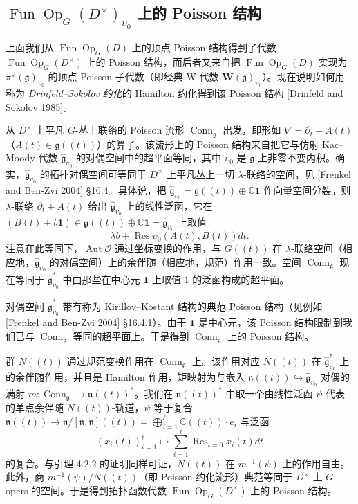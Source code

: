 \subsection{$\operatorname{Fun}\operatorname{Op}_G(D^\times)_{\upsilon_0}$ 上的 Poisson 结构}

上面我们从 $\operatorname{Fun}\operatorname{Op}_G(D)$ 上的顶点 Poisson 结构得到了代数 $\operatorname{Fun}\operatorname{Op}_G(D^\times)$ 上的 Poisson 结构，而后者又来自把 $\operatorname{Fun}\operatorname{Op}_G(D)$ 实现为 $\pi^\vee(\mathfrak g)_{\upsilon_0}$ 的顶点 Poisson 子代数（即经典 W-代数 $\mathbf W(\mathfrak g)_{\upsilon_0}$）。现在说明如何用称为 \emph{Drinfeld–Sokolov 约化}的 Hamilton 约化得到该 Poisson 结构 [Drinfeld and Sokolov 1985]。

从 $D^\times$ 上平凡 $G$-丛上联络的 Poisson 流形 $\operatorname{Conn}_{\mathfrak g}$ 出发，即形如 $\nabla=\partial_t+A(t)$（$A(t)\in\mathfrak g((t))$）的算子。该流形上的 Poisson 结构来自把它与仿射 Kac–Moody 代数 $\hat{\mathfrak g}_{\upsilon_0}$ 的对偶空间中的超平面等同，其中 $\upsilon_0$ 是 $\mathfrak g$ 上非零不变内积。确实，$\hat{\mathfrak g}_{\upsilon_0}$ 的拓扑对偶空间可等同于 $D^\times$ 上平凡丛上一切 $\lambda$-联络的空间，见 [Frenkel and Ben-Zvi 2004] §16.4。具体说，把 $\hat{\mathfrak g}_{\upsilon_0}=\mathfrak g((t))\oplus\mathbb C\mathbf 1$ 作向量空间分裂。则 $\lambda$-联络 $\partial_t+A(t)$ 给出 $\hat{\mathfrak g}_{\upsilon_0}$ 上的线性泛函，它在 $(B(t)+b\mathbf 1)\in\mathfrak g((t))\oplus\mathbb C\mathbf 1=\hat{\mathfrak g}_{\upsilon_0}$ 上取值
\[
    \lambda b+\operatorname{Res}\upsilon_0(A(t),B(t))dt.
\]
注意在此等同下，$\operatorname{Aut}\mathcal O$ 通过坐标变换的作用，与 $G((t))$ 在 $\lambda$-联络空间（相应地，$\hat{\mathfrak g}_{\upsilon_0}$ 的对偶空间）上的余伴随（相应地，规范）作用一致。空间 $\operatorname{Conn}_{\mathfrak g}$ 现在等同于 $\hat{\mathfrak g}^*_{\upsilon_0}$ 中由那些在中心元 $\mathbf 1$ 上取值 $1$ 的泛函构成的超平面。

对偶空间 $\hat{\mathfrak g}^*_{\upsilon_0}$ 带有称为 Kirillov–Kostant 结构的典范 Poisson 结构（见例如 [Frenkel and Ben-Zvi 2004] §16.4.1）。由于 $\mathbf 1$ 是中心元，该 Poisson 结构限制到我们已与 $\operatorname{Conn}_{\mathfrak g}$ 等同的超平面上。于是得到 $\operatorname{Conn}_{\mathfrak g}$ 上的 Poisson 结构。

群 $N((t))$ 通过规范变换作用在 $\operatorname{Conn}_{\mathfrak g}$ 上。该作用对应 $N((t))$ 在 $\hat{\mathfrak g}^*_{\upsilon_0}$ 上的余伴随作用，并且是 Hamilton 作用，矩映射为与嵌入 $\mathfrak n((t))\hookrightarrow\hat{\mathfrak g}_{\upsilon_0}$ 对偶的满射 $m:\operatorname{Conn}_{\mathfrak g}\to\mathfrak n((t))^*$。我们在 $\mathfrak n((t))^*$ 中取一个由线性泛函 $\psi$ 代表的单点余伴随 $N((t))$-轨道，$\psi$ 等于复合 $\mathfrak n((t))\to\mathfrak n/[\mathfrak n,\mathfrak n]((t))=\bigoplus_{i=1}^{\ell}\mathbb C((t))\cdot e_i$ 与泛函
\[
    (x_i(t))_{i=1}^{\ell}\mapsto\sum_{i=1}^{\ell}\operatorname{Res}_{t=0}x_i(t)dt
\]
的复合。与引理 4.2.2 的证明同样可证，$N((t))$ 在 $m^{-1}(\psi)$ 上的作用自由。此外，商 $m^{-1}(\psi)/N((t))$（即 Poisson 约化流形）典范等同于 $D^\times$ 上 $G$-opers 的空间。于是得到拓扑函数代数 $\operatorname{Fun}\operatorname{Op}_G(D^\times)$ 上的 Poisson 结构。

